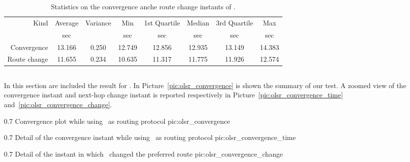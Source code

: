        \begin{table}[htbp]
            \centering
            \begin{tabular}{rccccccc}
            \toprule
            Kind & Average & Variance & Min & 1st Quartile &
            Median & 3rd Quartile & Max \\
            & \footnotesize{sec} & & \footnotesize{sec} & \footnotesize{sec} &
            \footnotesize{sec} & \footnotesize{sec} & \footnotesize{sec} \\
            \midrule
            Convergence & 13.166  & 0.250 & 12.749 & 12.856 & 12.935 & 13.149 &14.383\\
            Route change & 11.655 & 0.234 & 10.635 & 11.317 & 11.775 & 11.926 & 12.574\\
            \bottomrule
            \end{tabular}
            \caption{Statistics on the convergence anche route change
              instants of \batman.}
            \label{tab:convergence_batman}
        \end{table}

\clearpage
\subsection{\olsr}
In this section are included the result for \olsr.
In Picture~\ref{pic:olsr_convergence} is shown the summary of our
test. A zoomed view of the convergence instant and next-hop change
instant is reported respectively in
Picture~\ref{pic:olsr_convergence_time} and~\ref{pic:olsr_convergence_change}.

               {0.7 \columnwidth}
               {Convergence plot while using \olsr\ as routing protocol}
               {pic:olsr_convergence}

               {0.7 \columnwidth}
               {Detail of the convergence instant while using \olsr\ as routing protocol}
               {pic:olsr_convergence_time}

               {0.7 \columnwidth}
               {Detail of the instant in which \olsr\ changed the
                 preferred route}
               {pic:olsr_convergence_change}

